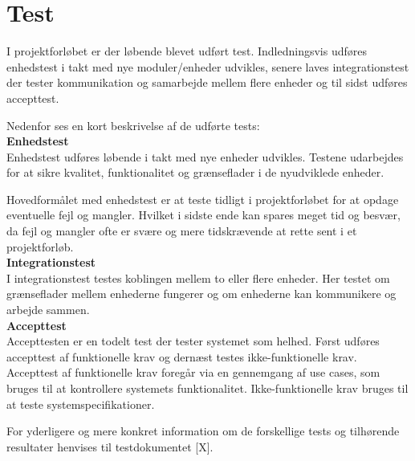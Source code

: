 \section{Test}

\label{chap:test}

I projektforløbet er der løbende blevet udført test. Indledningsvis udføres enhedstest i takt med nye moduler/enheder udvikles, senere laves integrationstest der tester kommunikation og samarbejde mellem flere enheder og til sidst udføres accepttest.

Nedenfor ses en kort beskrivelse af de udførte tests:\\


\textbf{Enhedstest} \\
Enhedstest udføres løbende i takt med nye enheder udvikles. Testene udarbejdes for at sikre kvalitet, funktionalitet og grænseflader i de nyudviklede enheder. 

Hovedformålet med enhedstest er at teste tidligt i projektforløbet for at opdage eventuelle fejl og mangler. Hvilket i sidste ende kan spares meget tid og besvær, da fejl og mangler ofte er svære og mere tidskrævende at rette sent i et projektforløb.\\


\textbf{Integrationstest} \\
I integrationstest testes koblingen mellem to eller flere enheder. Her testet om grænseflader mellem enhederne fungerer og om enhederne kan kommunikere og arbejde sammen.  \\



\textbf{Accepttest} \\
Accepttesten er en todelt test der tester systemet som helhed. 
Først udføres accepttest af funktionelle krav og dernæst testes ikke-funktionelle krav.
Accepttest af funktionelle krav foregår via en gennemgang af use cases, som bruges til at kontrollere systemets funktionalitet. Ikke-funktionelle krav bruges til at teste systemspecifikationer.  

For yderligere og mere konkret information om de forskellige tests og tilhørende resultater henvises til testdokumentet [X].
